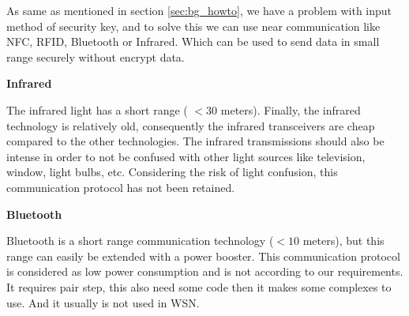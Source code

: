 As same as mentioned in section \ref{sec:bg_howto}, we have a problem with input method of security key, and to solve this we can use near communication like NFC, RFID, Bluetooth or Infrared. Which can be used to send data in small range securely without encrypt data. 

{\bf Infrared\cite{infrared}}

The infrared light has a short range ( $<30$ meters). Finally, the infrared technology is relatively old, consequently the infrared transceivers are cheap compared to the other technologies. The infrared transmissions should also be intense in order to not be confused with other light sources like television, window, light bulbs, etc. Considering the risk of light confusion, this communication protocol has not been retained.


{\bf Bluetooth\cite{bluetooth}}

Bluetooth is a short range communication technology ($< 10$ meters), but this range can easily be extended with a power booster. This communication protocol is considered as low power consumption and is not according to our requirements. It requires pair step, this also need some code then it makes some complexes to use. And it usually is not used in WSN.

